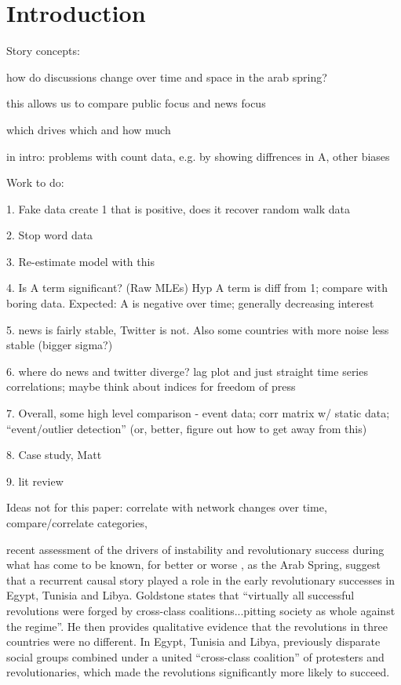 \section{Introduction}

Story concepts:

how do discussions change over time and space in the arab spring?

this allows us to compare public focus and news focus

which drives which and how much

in intro: problems with count data, e.g. by showing diffrences in A, other biases

Work to do:

1. Fake data
	create 1 that is positive, does it recover
	random walk data

2. Stop word data

3. Re-estimate model with this	

4. Is A term significant? (Raw MLEs) Hyp A term is diff from 1; compare with boring data. Expected: A is negative over time; generally decreasing interest

5. news is fairly stable, Twitter is not. Also some countries with more noise less stable (bigger sigma?)

6. where do news and twitter diverge?  lag plot and just straight time series correlations; maybe think about indices for freedom of press

7. Overall, some high level comparison - event data; corr matrix w/ static data; ``event/outlier  detection'' (or, better, figure out how to get away from this)

8. Case study, Matt

9. lit review

Ideas not for this paper:
	correlate with network changes over time, compare/correlate categories, 


 recent assessment of the drivers of instability and revolutionary success during what has come to be known, for better or worse \cite{gelvin_arab_2015}, as the Arab Spring, suggest that a recurrent causal story played a role in the early revolutionary successes in Egypt, Tunisia and Libya.  Goldstone states that ``virtually all successful revolutions were forged by cross-class coalitions...pitting society as whole against the regime''. He then provides qualitative evidence that the revolutions in three countries were no different.  In Egypt, Tunisia and Libya, previously disparate social groups combined under a united ``cross-class coalition'' of protesters and revolutionaries, which made the revolutions significantly more likely to succeed.

